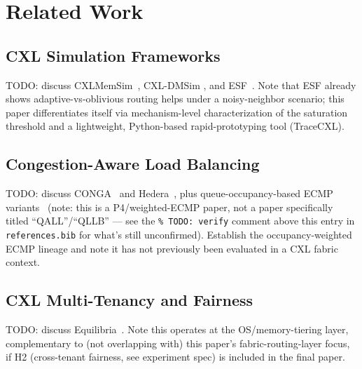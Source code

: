 %

\section{Related Work}
\label{sec:related-work}

\subsection{CXL Simulation Frameworks}
TODO: discuss CXLMemSim~\cite{yang2023cxlmemsim}, CXL-DMSim
\cite{wang2025cxldmsim}, and ESF~\cite{an2024esf}. Note that ESF already
shows adaptive-vs-oblivious routing helps under a noisy-neighbor scenario;
this paper differentiates itself via mechanism-level characterization of
the saturation threshold and a lightweight, Python-based rapid-prototyping
tool (TraceCXL).

\subsection{Congestion-Aware Load Balancing}
TODO: discuss CONGA~\cite{alizadeh2014conga} and
Hedera~\cite{alfares2010hedera}, plus queue-occupancy-based ECMP
variants~\cite{ye2018wecmp} (note: this is a P4/weighted-ECMP paper, not a
paper specifically titled ``QALL''/``QLLB'' — see the
\texttt{\% TODO: verify} comment above this entry in
\texttt{references.bib} for what's still unconfirmed). Establish the
occupancy-weighted ECMP lineage and note it has not previously been
evaluated in a CXL fabric context.

\subsection{CXL Multi-Tenancy and Fairness}
TODO: discuss Equilibria~\cite{zhao2026equilibria}. Note this operates at
the OS/memory-tiering layer, complementary to (not overlapping with) this
paper's fabric-routing-layer focus, if H2 (cross-tenant fairness, see
experiment spec) is included in the final paper.
